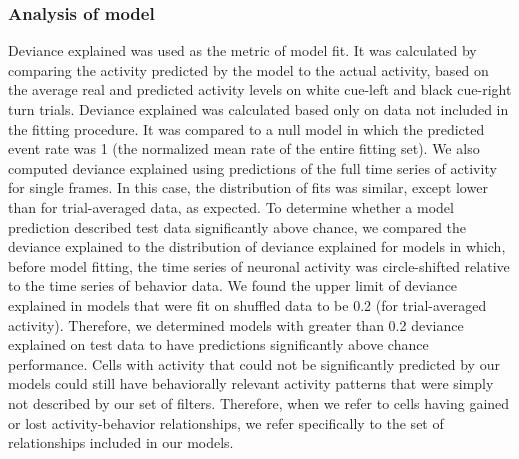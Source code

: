\subsubsection{Analysis of model}\label{methods:analysis_of_model}
Deviance explained was used as the metric of model fit. It was calculated by comparing the activity predicted by the model to the actual activity, based on the average real and predicted activity levels on white cue-left and black cue-right turn trials. Deviance explained was calculated based only on data not included in the fitting procedure. It was compared to a null model in which the predicted event rate was 1 (the normalized mean rate of the entire fitting set). We also computed deviance explained using predictions of the full time series of activity for single frames. In this case, the distribution of fits was similar, except lower than for trial-averaged data, as expected. To determine whether a model prediction described test data significantly above chance, we compared the deviance explained to the distribution of deviance explained for models in which, before model fitting, the time series of neuronal activity was circle-shifted relative to the time series of behavior data. We found the upper limit of deviance explained in models that were fit on shuffled data to be 0.2 (for trial-averaged activity). Therefore, we determined models with greater than 0.2 deviance explained on test data to have predictions significantly above chance performance. Cells with activity that could not be significantly predicted by our models could still have behaviorally relevant activity patterns that were simply not described by our set of filters. Therefore, when we refer to cells having gained or lost activity-behavior relationships, we refer specifically to the set of relationships included in our models. 
\bigskip
